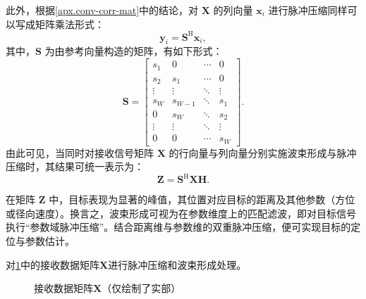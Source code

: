 此外，根据\cref{apx.conv-corr-mat}中的结论，对 $\mathbf{X}$ 的列向量 $\bm{x}_i$ 进行脉冲压缩同样可以写成矩阵乘法形式：
\[
    \bm{y}_i = \mathbf{S}^{\mathrm{H}}\bm{x}_i,
\]
其中，$\mathbf{S}$ 为由参考向量构造的矩阵，有如下形式：
\[
    \mathbf{S} =
    \begin{bmatrix}
        s_1    & 0       & \cdots & 0      \\
        s_2    & s_1     & \cdots & 0      \\
        \vdots & \vdots  & \ddots & \vdots \\
        s_W    & s_{W-1} & \ddots & s_1    \\
        0      & s_W     & \ddots & s_2    \\
        \vdots & \vdots  & \ddots & \vdots \\
        0      & 0       & \cdots & s_W
    \end{bmatrix}.
\]
由此可见，当同时对接收信号矩阵 $\mathbf{X}$ 的行向量与列向量分别实施波束形成与脉冲压缩时，其结果可统一表示为：
\[
    \mathbf{Z} = \mathbf{S}^{\mathrm{H}} \mathbf{X}\mathbf{H}.
\]

在矩阵 $\mathbf{Z}$ 中，目标表现为显著的峰值，其位置对应目标的距离及其他参数（方位或径向速度）。换言之，波束形成可视为在参数维度上的匹配滤波，即对目标信号执行``参数域脉冲压缩''。结合距离维与参数维的双重脉冲压缩，便可实现目标的定位与参数估计。

\begin{example}
    对\cref{fig_data_x}中的接收数据矩阵\( \mathbf{X} \)进行脉冲压缩和波束形成处理。

    \begin{figure}[htb!]
        \centering
        \caption{接收数据矩阵\( \mathbf{X} \)（仅绘制了实部）}
        \label{fig_data_x}
    \end{figure}
\end{example}

